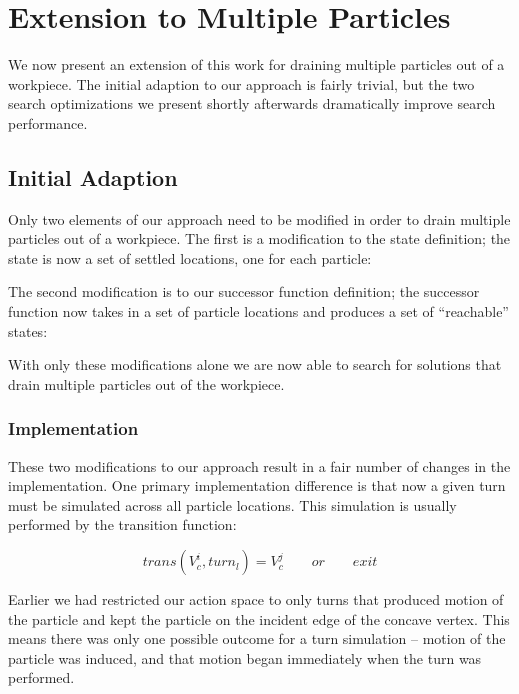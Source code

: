 \chapter{Extension to Multiple Particles}\label{multipleExtension}

We now present an extension of this work for draining multiple particles out of a workpiece. The initial adaption to our approach is fairly trivial, but the two search optimizations we present shortly afterwards dramatically improve search performance.

\section{Initial Adaption}

Only two elements of our approach need to be modified in order to drain multiple particles out of a workpiece. The first is a modification to the state definition; the state is now a set of settled locations, one for each particle:

 {
  \label{eq:multipleParticleState}
}

The second modification is to our successor function definition; the successor function now takes in a set of particle locations and produces a set of ``reachable'' states:

 {
  \label{eq:successorMultipleParticle}
}

With only these modifications alone we are now able to search for solutions that drain multiple particles out of the workpiece.

\subsection{Implementation}

These two modifications to our approach result in a fair number of changes in the implementation. One primary implementation difference is that now a given turn must be simulated across all particle locations. This simulation is usually performed by the transition function:

$$
trans(V_{c}^{i}, turn_{l}) = V_{c}^j \qquad or \qquad exit
$$

Earlier we had restricted our action space to only turns that produced motion of the particle and kept the particle on the incident edge of the concave vertex. This means there was only one possible outcome for a turn simulation -- motion of the particle was induced, and that motion began immediately when the turn was performed.

